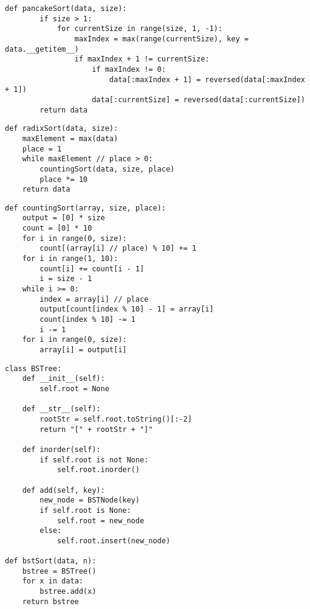 \begin{center}
    \captionsetup{justification=raggedright,singlelinecheck=off}
    \begin{lstlisting}[label=lst:pancake_sort,caption=Алгоритм блинной сортировки]
	def pancakeSort(data, size):
		if size > 1:
			for currentSize in range(size, 1, -1):
				maxIndex = max(range(currentSize), key = data.__getitem__)
				if maxIndex + 1 != currentSize:
					if maxIndex != 0:
						data[:maxIndex + 1] = reversed(data[:maxIndex + 1])
					data[:currentSize] = reversed(data[:currentSize])
		return data
	\end{lstlisting}
\end{center}

\begin{center}
\captionsetup{justification=raggedright,singlelinecheck=off}
\begin{lstlisting}[label=lst:radix_sort,caption=Алгоритм поразрядной сортировки]
def radixSort(data, size):
	maxElement = max(data)
	place = 1
	while maxElement // place > 0:
		countingSort(data, size, place)
		place *= 10
	return data
\end{lstlisting}
\end{center}


\begin{center}
\captionsetup{justification=raggedright,singlelinecheck=off}
\begin{lstlisting}[label=lst:counting_sort,caption=Алгоритм сортировки подсчётом]
def countingSort(array, size, place):
	output = [0] * size
	count = [0] * 10
	for i in range(0, size):
		count[(array[i] // place) % 10] += 1
	for i in range(1, 10):
		count[i] += count[i - 1]
		i = size - 1
	while i >= 0:
		index = array[i] // place
		output[count[index % 10] - 1] = array[i]
		count[index % 10] -= 1
		i -= 1
	for i in range(0, size):
		array[i] = output[i]
\end{lstlisting}
\end{center}

\begin{center}
	\captionsetup{justification=raggedright,singlelinecheck=off}
	\begin{lstlisting}[label=lst:bst_sort,caption=Алгоритм сортировки бинарным деревом]
class BSTree:
	def __init__(self):
		self.root = None
	
	def __str__(self):
		rootStr = self.root.toString()[:-2]
		return "[" + rootStr + "]"
	
	def inorder(self):
		if self.root is not None:
			self.root.inorder()
	
	def add(self, key):
		new_node = BSTNode(key)
		if self.root is None:
			self.root = new_node
		else:
			self.root.insert(new_node)

def bstSort(data, n):
	bstree = BSTree()
	for x in data:
		bstree.add(x)
	return bstree
	\end{lstlisting}
\end{center}

